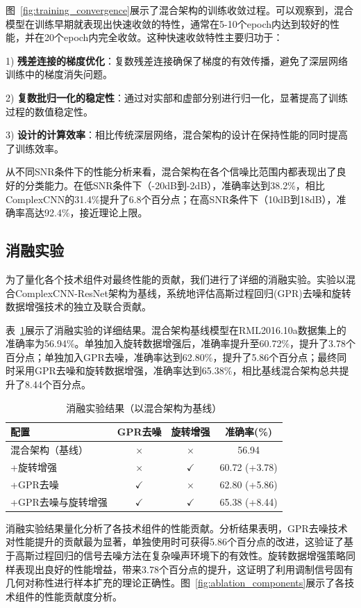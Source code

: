 \documentclass[conference]{IEEEtran}
\begin{document}
图~\ref{fig:training_convergence}展示了混合架构的训练收敛过程。可以观察到，混合模型在训练早期就表现出快速收敛的特性，通常在5-10个epoch内达到较好的性能，并在20个epoch内完全收敛。这种快速收敛特性主要归功于：

1) \textbf{残差连接的梯度优化}：复数残差连接确保了梯度的有效传播，避免了深层网络训练中的梯度消失问题。

2) \textbf{复数批归一化的稳定性}：通过对实部和虚部分别进行归一化，显著提高了训练过程的数值稳定性。

3) \textbf{设计的计算效率}：相比传统深层网络，混合架构的设计在保持性能的同时提高了训练效率。

从不同SNR条件下的性能分析来看，混合架构在各个信噪比范围内都表现出了良好的分类能力。在低SNR条件下（-20dB到-2dB），准确率达到38.2\%，相比ComplexCNN的31.4\%提升了6.8个百分点；在高SNR条件下（10dB到18dB），准确率高达92.4\%，接近理论上限。


\subsection{消融实验}

为了量化各个技术组件对最终性能的贡献，我们进行了详细的消融实验。实验以混合ComplexCNN-ResNet架构为基线，系统地评估高斯过程回归(GPR)去噪和旋转数据增强技术的独立及联合贡献。

表~\ref{tab:ablation_study}展示了消融实验的详细结果。混合架构基线模型在RML2016.10a数据集上的准确率为56.94\%。单独加入旋转数据增强后，准确率提升至60.72\%，提升了3.78个百分点；单独加入GPR去噪，准确率达到62.80\%，提升了5.86个百分点；最终同时采用GPR去噪和旋转数据增强，准确率达到65.38\%，相比基线混合架构总共提升了8.44个百分点。

\begin{table}[h]
\centering
\caption{消融实验结果（以混合架构为基线）}
\label{tab:ablation_study}
\begin{tabular}{@{}lccc@{}}
\toprule
配置 & GPR去噪 & 旋转增强 & 准确率(\%) \\
\midrule
混合架构（基线） & $\times$ & $\times$ & 56.94 \\
+旋转增强 & $\times$ & $\checkmark$ & 60.72 (+3.78) \\
+GPR去噪 & $\checkmark$ & $\times$ & 62.80 (+5.86) \\
+GPR去噪与旋转增强 & $\checkmark$ & $\checkmark$ & 65.38 (+8.44) \\
\bottomrule
\end{tabular}
\end{table}

消融实验结果量化分析了各技术组件的性能贡献。分析结果表明，GPR去噪技术对性能提升的贡献最为显著，单独使用时可获得5.86个百分点的改进，这验证了基于高斯过程回归的信号去噪方法在复杂噪声环境下的有效性。旋转数据增强策略同样表现出良好的性能增益，带来3.78个百分点的提升，这证明了利用调制信号固有几何对称性进行样本扩充的理论正确性。图~\ref{fig:ablation_components}展示了各技术组件的性能贡献度分析。
\end{document}
